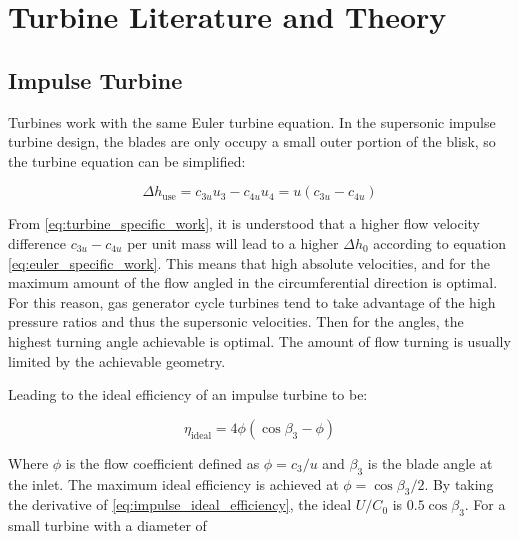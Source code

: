 
\section{Turbine Literature and Theory}

\subsection{Impulse Turbine}


Turbines work with the same Euler turbine equation. In the supersonic impulse turbine design, the blades are only occupy a small outer portion of the blisk, so the turbine equation can be simplified:

\begin{equation}
    \Delta h_{\textrm{use}}=c_{3u}u_3-c_{4u}u_4=u(c_{3u}-c_{4u})
    \label{eq:turbine_specific_work}
\end{equation}

From \cref{eq:turbine_specific_work}, it is understood that a higher flow velocity difference $c_{3u}-c_{4u}$ per unit mass will lead to a higher $\Delta h_0$ according to equation \cref{eq:euler_specific_work}. This means that high absolute velocities, and for the maximum amount of the flow angled in the circumferential direction is optimal. For this reason, gas generator cycle turbines tend to take advantage of the high pressure ratios and thus the supersonic velocities. Then for the angles, the highest turning angle achievable is optimal. The amount of flow turning is usually limited by the achievable geometry.



Leading to the ideal efficiency of an impulse turbine to be:

\begin{equation}
    \eta_{\textrm{ideal}} = 4\phi(\cos\beta_3-\phi)
    \label{eq:impulse_ideal_efficiency}
\end{equation}

Where $\phi$ is the flow coefficient defined as $\phi=c_3/u$ and $\beta_3$ is the blade angle at the inlet. The maximum ideal efficiency is achieved at $\phi=\cos\beta_3/2$. By taking the derivative of \cref{eq:impulse_ideal_efficiency}, the ideal $U/C_0$ is $0.5\cos\beta_3$. For a small turbine with a diameter of 


